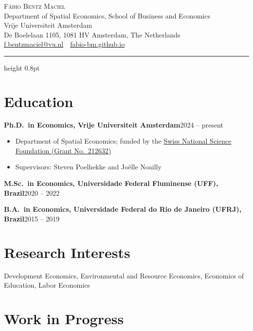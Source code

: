 \documentclass[11pt]{article}
\newcommand{\entry}[2]{\noindent\textbf{#1}\hfill #2\par}
\newenvironment{tightlist}
  {\begin{itemize}[leftmargin=1.6em,itemsep=1pt,parsep=0pt,topsep=2pt]}
  {\end{itemize}}
\begin{document}
\thispagestyle{empty}

\begin{center}
  {\LARGE\scshape Fábio Bentz Maciel}\\[6pt]
  Department of Spatial Economics, School of Business and Economics\\
  Vrije Universiteit Amsterdam\\
  De Boelelaan 1105, 1081 HV Amsterdam, The Netherlands\\[3pt]
  \href{mailto:f.bentzmaciel@vu.nl}{f.bentzmaciel@vu.nl}
  \,\textbullet\, \href{https://fabio-bm.github.io}{fabio-bm.github.io}
\end{center}
\vspace{2pt}
\hrule height 0.8pt

\section*{Education}

\entry{Ph.D.\ in Economics, Vrije Universiteit Amsterdam}{2024 -- present}
\begin{tightlist}
  \item Department of Spatial Economics; funded by the
        \href{https://data.snf.ch/grants/grant/212632}{Swiss National Science Foundation (Grant No.\ 212632)}
  \item Supervisors: Steven Poelhekke and Joëlle Noailly
\end{tightlist}

\entry{M.Sc.\ in Economics, Universidade Federal Fluminense (UFF), Brazil}{2020 -- 2022}

\entry{B.A.\ in Economics, Universidade Federal do Rio de Janeiro (UFRJ), Brazil}{2015 -- 2019}

\section*{Research Interests}
Development Economics, Environmental and Resource Economics, Economics of Education, Labor Economics

\section*{Work in Progress}
\end{document}
